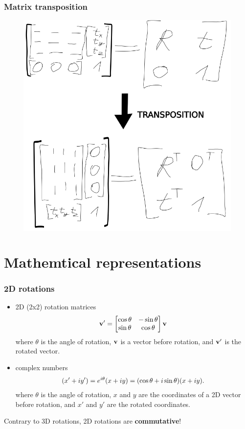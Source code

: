 \documentclass{beamer}
\begin{document}
\begin{frame}
\frametitle{Matrix transposition}
\begin{figure}
	\centering
	\includegraphics[width=0.8\textheight]{assets/transformation_matrix_transposition.png}
\end{figure}
\end{frame}


\section{Mathemtical representations}


\begin{frame}
\frametitle{2D rotations}
\begin{itemize}
	\item 2D (2x2) rotation matrices
	\begin{equation*} 
		\vecsymb{v}^{\prime} = \rotmatII{\theta} \vecsymb{v}
	\end{equation*}
	where $\theta$ is the angle of rotation, $\vv{v}$ is a vector before rotation, and $\vv{v}^\prime$ is the rotated vector.

	\item complex numbers 
	\begin{equation*}
		(x'+iy') = e^{i\theta}(x+iy) = (\cos\theta + i\sin{\theta})(x+iy).
	\end{equation*}
	where $\theta$ is the angle of rotation, $x$ and $y$ are the coordinates of a 2D vector before rotation, and $x'$ and $y'$ are the rotated coordinates.
\end{itemize}
Contrary to 3D rotations, 2D rotations are \textbf{commutative}!
\end{frame}
\end{document}
